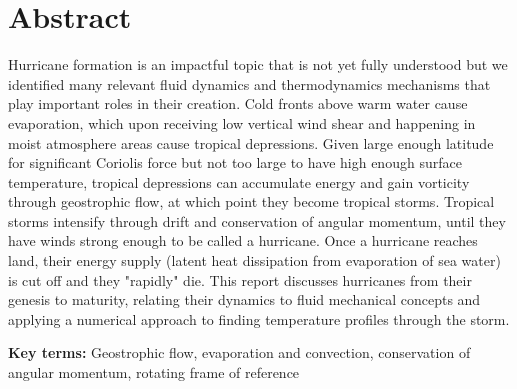 \chapter{Abstract}
\begin{tcolorbox}[title=Abstract,colbacktitle=white!80!black,coltitle=black,arc=0mm,boxrule=0.1mm]
Hurricane formation is an impactful topic that is not yet fully understood but we identified many relevant fluid dynamics and thermodynamics mechanisms that play important roles in their creation. Cold fronts above warm water cause evaporation, which upon receiving low vertical wind shear and happening in moist atmosphere areas cause tropical depressions. Given large enough latitude for significant Coriolis force but not too large to have high enough surface temperature, tropical depressions can accumulate energy and gain vorticity through geostrophic flow, at which point they become tropical storms. Tropical storms intensify through drift and conservation of angular momentum, until they have winds strong enough to be called a hurricane. Once a hurricane reaches land, their energy supply (latent heat dissipation from evaporation of sea water) is cut off and they "rapidly" die. This report discusses hurricanes from their genesis to maturity, relating their dynamics to fluid mechanical concepts and applying a numerical approach to finding temperature profiles through the storm.
\vspace{5mm}

\textbf{Key terms:} Geostrophic flow, evaporation and convection, conservation of angular momentum, rotating frame of reference
\end{tcolorbox}